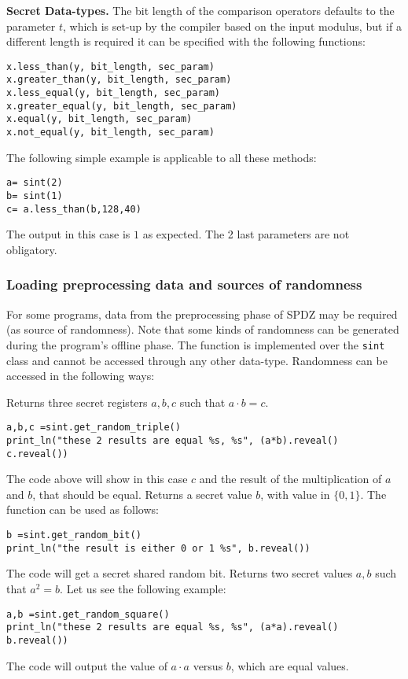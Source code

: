\noindent
\textbf{Secret Data-types.}  The bit length of the comparison operators defaults to the parameter $t$, which is set-up by the compiler based on the input modulus, but if a different length is required it can be specified with the following functions:

\begin{lstlisting}
x.less_than(y, bit_length, sec_param)
x.greater_than(y, bit_length, sec_param)
x.less_equal(y, bit_length, sec_param)
x.greater_equal(y, bit_length, sec_param)
x.equal(y, bit_length, sec_param)
x.not_equal(y, bit_length, sec_param)
\end{lstlisting}

\noindent
The following simple example is applicable to all these methods: 
\begin{lstlisting}
a= sint(2)
b= sint(1)
c= a.less_than(b,128,40)
\end{lstlisting}
The output in this case is $1$ as expected. The 2 last parameters are not obligatory.
\subsubsection{Loading preprocessing data and sources of randomness}

For some programs, data from the preprocessing phase of SPDZ may be required (as source of randomness). Note that some kinds of randomness can  be generated during the program's offline phase. The function is implemented over the \verb|sint| class and cannot be accessed through any other data-type. Randomness can be accessed in the following ways:

Returns three secret registers $a, b, c$ such that $a\cdot b = c$.
\begin{lstlisting}
a,b,c =sint.get_random_triple()
print_ln("these 2 results are equal %s, %s", (a*b).reveal() c.reveal())
\end{lstlisting}
The code above will show in this case $c$ and the result of the multiplication of $a$ and $b$, that should be equal.
Returns a secret value $b$, with value in $\{0, 1\}$. The function can be used as follows:
\begin{lstlisting}
b =sint.get_random_bit()
print_ln("the result is either 0 or 1 %s", b.reveal())
\end{lstlisting}
The code will get a secret shared random bit.
Returns two secret values $a, b$ such that $a^2 = b$. Let us see the following example: 
\begin{lstlisting}
a,b =sint.get_random_square()
print_ln("these 2 results are equal %s, %s", (a*a).reveal() b.reveal())
\end{lstlisting}
The code will output the value of $a \cdot a$ versus $b$,  which are equal values. 

